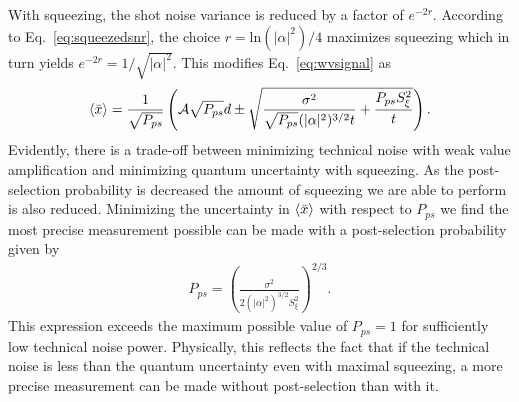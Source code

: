 With squeezing, the shot noise variance is reduced by a factor of $e^{-2r}$.  According to Eq.~\eqref{eq:squeezedsnr}, the choice $r = \text{ln}(|\alpha|^2)/4$ maximizes squeezing which in turn yields $e^{-2r} = 1/\sqrt{|\alpha|^2}$.  This modifies Eq.~\eqref{eq:wvsignal} as
\begin{align}
\left\langle \bar{x} \right\rangle = \frac{1}{\sqrt{P_{ps}}}\left(\mathcal{A}\sqrt{P_{ps}}d \pm \sqrt{\frac{\sigma^2}{\sqrt{P_{ps}}(|\alpha|^2)^{3/2} t} + \frac{P_{ps}S_\xi^2}{t}}\right).
\end{align}
Evidently, there is a trade-off between minimizing technical noise with weak value amplification and minimizing quantum uncertainty with squeezing.  As the post-selection probability is decreased the amount of squeezing we are able to perform is also reduced.  Minimizing the uncertainty in $\left\langle \bar{x} \right\rangle$ with respect to $P_{ps}$ we find the most precise measurement possible can be made with a post-selection probability given by 
\begin{align}
P_{ps} = \left(\frac{\sigma^2}{2(|\alpha|^2)^{3/2}S_\xi^2}\right)^{2/3}.
\end{align}
This expression exceeds the maximum possible value of $P_{ps} = 1$ for sufficiently low technical noise power.  Physically, this reflects the fact that if the technical noise is less than the quantum uncertainty even with maximal squeezing, a more precise measurement can be made without post-selection than with it.  


